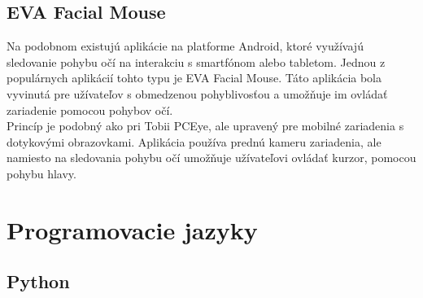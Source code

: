 \subsection{EVA Facial Mouse}
Na podobnom existujú aplikácie na platforme Android, ktoré využívajú sledovanie pohybu očí na interakciu s smartfónom alebo tabletom. Jednou z populárnych aplikácií tohto typu je EVA Facial Mouse. Táto aplikácia bola vyvinutá pre užívateľov s obmedzenou pohyblivosťou a umožňuje im ovládať zariadenie pomocou pohybov očí.\\
\tab[5 mm] Princíp je podobný ako pri Tobii PCEye, ale upravený pre mobilné zariadenia s dotykovými obrazovkami. Aplikácia používa prednú kameru zariadenia, ale namiesto na sledovania pohybu očí umožňuje užívateľovi ovládať kurzor, pomocou pohybu hlavy.



\newpage
\section{Programovacie jazyky}
\subsection{Python}
